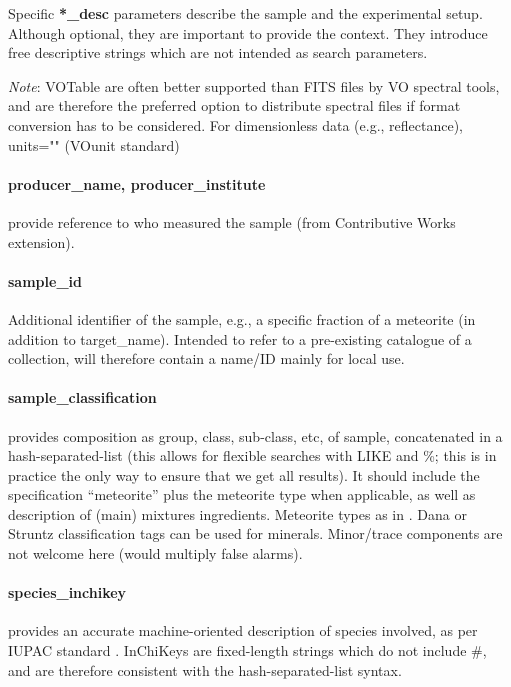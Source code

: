 \documentclass[11pt,a4paper]{ivoa}
\begin{document}
Specific \textbf{*\_desc} parameters describe the sample and the
experimental setup. Although optional, they are important to provide the
context. They introduce free descriptive strings which are not intended
as search parameters.

\emph{Note}: VOTable are often better supported than FITS files by VO
spectral tools, and are therefore the preferred option to distribute
spectral files if format conversion has to be considered. For
dimensionless data (e.g., reflectance), units="" (VOunit standard)

\paragraph{producer\_name, producer\_institute}

provide reference to who measured the sample
(from Contributive Works extension).

\paragraph{sample\_id}

Additional identifier of the sample, e.g., a specific fraction of a meteorite
(in addition to target\_name).
Intended to refer to a pre-existing catalogue of a collection,
will therefore contain a name/ID mainly for local use.

\paragraph{sample\_classification}

provides composition as group, class, sub-class, etc, of sample,
concatenated in a hash-separated-list (this allows for flexible searches
with LIKE and \%; this is in practice the only way to ensure that we
get all results). It should include the specification ``meteorite''
plus the meteorite type when applicable, as well as description of
(main) mixtures ingredients. Meteorite types as in \citep{Krot:2005mz}. Dana
or Struntz classification tags can be used for minerals. Minor/trace
components are not welcome here (would multiply false alarms).

\paragraph{\textbf{species\_inchikey} }

provides an accurate machine-oriented description of species involved, 
as per IUPAC standard \citep{heller2015}. InChiKeys are fixed-length strings 
which do not include \#, and are therefore consistent with the 
hash-separated-list syntax.
\end{document}
